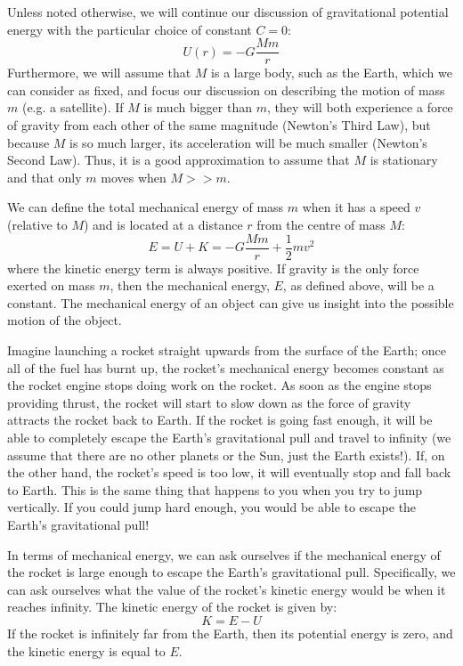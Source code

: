 Unless noted otherwise, we will continue our discussion of gravitational potential energy with the particular choice of constant $C=0$:
\begin{equation}
\boxed{U(r) = -G\frac{Mm}{r}}
\end{equation}
Furthermore, we will assume that $M$ is a large body, such as the Earth, which we can consider as fixed, and focus our discussion on describing the motion of mass $m$ (e.g. a satellite). If $M$ is much bigger than $m$, they will both experience a force of gravity from each other of the same magnitude (Newton's Third Law), but because $M$ is so much larger, its acceleration will be much smaller (Newton's Second Law). Thus, it is a good approximation to assume that $M$ is stationary and that only $m$ moves when $M>>m$.

We can define the total mechanical energy of mass $m$ when it has a speed $v$ (relative to $M$) and is located at a distance $r$ from the centre of mass $M$:
\begin{equation}
E = U + K = -G\frac{Mm}{r}+\frac{1}{2}mv^2
\end{equation}
where the kinetic energy term is always positive. If gravity is the only force exerted on mass $m$, then the mechanical energy, $E$, as defined above, will be a constant. The mechanical energy of an object can give us insight into the possible motion of the object.

Imagine launching a rocket straight upwards from the surface of the Earth; once all of the fuel has burnt up, the rocket's mechanical energy becomes constant as the rocket engine stops doing work on the rocket. As soon as the engine stops providing thrust, the rocket will start to slow down as the force of gravity attracts the rocket back to Earth. If the rocket is going fast enough, it will be able to completely escape the Earth's gravitational pull and travel to infinity (we assume that there are no other planets or the Sun, just the Earth exists!). If, on the other hand, the rocket's speed is too low, it will eventually stop and fall back to Earth. This is the same thing that happens to you when you try to jump vertically. If you could jump hard enough, you would be able to escape the Earth's gravitational pull!

In terms of mechanical energy, we can ask ourselves if the mechanical energy of the rocket is large enough to escape the Earth's gravitational pull. Specifically, we can ask ourselves what the value of the rocket's kinetic energy would be when it reaches infinity. The kinetic energy of the rocket is given by:
\begin{equation}
K = E - U
\end{equation}
If the rocket is infinitely far from the Earth, then its potential energy is zero, and the kinetic energy is equal to $E$.

